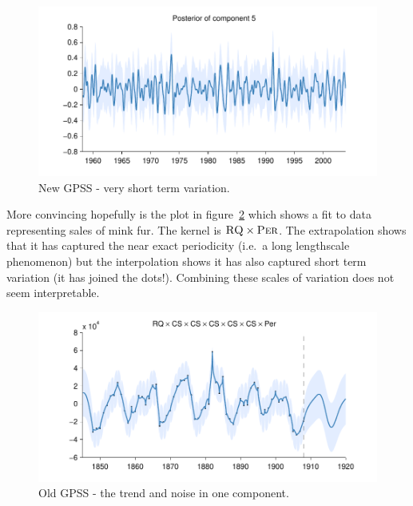 \documentclass{article}
\def\ie{i.e.\ }
\begin{document}
\begin{figure}[h]
\centering
\includegraphics[width=0.98\columnwidth]{figures/03-mauna/03-mauna_5}
\caption{New GPSS - very short term variation.}
\label{fig:short}
\end{figure}

More convincing hopefully is the plot in figure~\ref{fig:RQ_bad} which shows a fit to data representing sales of mink fur.
The kernel is ${\textsc{RQ}} \times {\textsc{Per}}$.
The extrapolation shows that it has captured the near exact periodicity (\ie a long lengthscale phenomenon) but the interpolation shows it has also captured short term variation (it has joined the dots!).
Combining these scales of variation does not seem interpretable.

\begin{figure}[h]
\centering
\includegraphics[width=0.98\columnwidth]{figures/old-gpss/fur-sales-mink-h-b-co-18481911_1}
\caption{Old GPSS - the trend and noise in one component.}
\label{fig:RQ_bad}
\end{figure}
\end{document}

